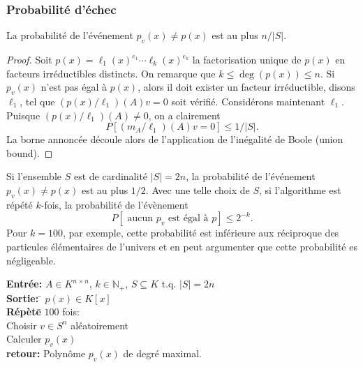   
  \subsubsection*{Probabilité d'échec}
  
   \begin{theorem}
     \label{thr:63}
     La probabilité de l'événement $p_v(x) \neq p(x)$ est au plus $n/|S|$.
   \end{theorem}
   \begin{proof}
     Soit $p(x) = \ell_1(x)^{e_1} \cdots \ell_k(x)^{e_k}$ la
     factorisation unique de $p(x)$ en facteurs irréductibles
     distincts. On remarque que $k \leq \deg(p(x)) \leq n$. Si
     $p_v(x)$ n'est pas égal à $p(x)$, alors il doit exister un
     facteur irréductible, disons $\ell_1$, tel que
     $(p(x)/ \ell_1)(A) v =0$ soit vérifié. Considérons maintenant
     $\ell_1$. Puisque $(p(x)/ \ell_1)(A) \neq 0$, on a clairement
     \begin{displaymath}
       P \left[ (m_A/ \ell_1)(A) v = 0 \right]  \leq 1/|S|.
     \end{displaymath}
     La borne annoncée découle alors de l'application de l'inégalité de Boole (union bound).
   \end{proof}


Si l'ensemble $S$ est de cardinalité $|S| = 2 n$, la probabilité de l'événement $p_v(x) \neq p(x)$ est au plus $1/2$. Avec une telle choix de $S$, si l'algorithme est répété $k$-fois, la probabilité de l'évènement
\begin{displaymath}
  P \left[ \text{ aucun } p_v  \text{ est égal à } p \right]  \leq 2^{-k}. 
\end{displaymath}
Pour $k = 100$, par exemple, cette probabilité est inférieure aux réciproque des particules élémentaires de l'univers et en peut argumenter que cette probabilité es négligeable. 

\begin{algorithm}%
\label{alg:5}
  \caption{Polynôme minimal} 
\begin{tabbing}
\textbf{Entrée:} $A ∈ K^{n ×n}$, $k ∈ ℕ_+$, $S ⊆ K$ t.q. $|S| = 2n$ \\
\textbf{Sortie:} \= $p(x) ∈ K[x]$  \\
\pushtabs
\textbf{Répète}\= $100$ fois: \\
\> Choisir $v ∈ S^n$ aléatoirement\\
\> Calculer $p_v(x)$\\
\textbf{ retour:} Polynôme $p_v(x)$ de degré maximal.
\poptabs
\end{tabbing}
\end{algorithm}

